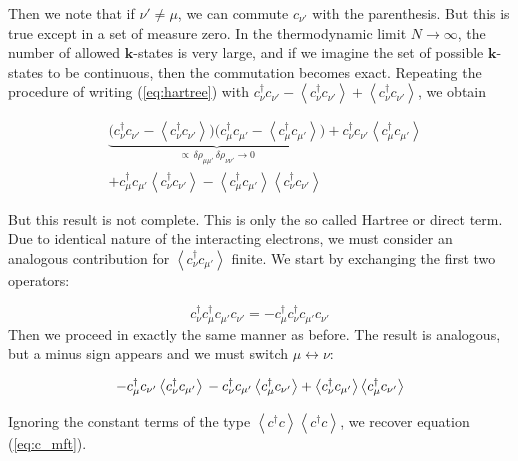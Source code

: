 \documentclass[10pt, twocolumn, twoside]{article}
\begin{document}
Then we note that if $\nu' \neq \mu$, we can commute $c_{\nu'}$ with the parenthesis. But this is true except in a set of measure zero. In the thermodynamic limit $N \rightarrow \infty$, the number of allowed $\bm k$-states is very large, and if we imagine the set of possible $\bm k$-states to be continuous, then the commutation becomes exact. Repeating the procedure of writing (\ref{eq:hartree}) with $c_\nu^\dagger c_{\nu'} - \left\langle c_\nu^\dagger c_{\nu'} \right\rangle + \left\langle c_\nu^\dagger c_{\nu'} \right\rangle $, we obtain

\begin{equation}
\begin{split}
&\underbrace{\big( c_\nu^\dagger c_{\nu'} - \left\langle c_\nu^\dagger c_{\nu'} \right\rangle \big) \big( c_\mu^\dagger c_{\mu'} - \left\langle c_\mu^\dagger c_{\mu'} \right\rangle \big)}_{\propto \, \delta \rho_{\mu\mu'} \, \delta \rho_{\nu\nu'} \rightarrow 0} + c_\nu^\dagger c_{\nu'} \left\langle c_\mu^\dagger c_{\mu'} \right\rangle \\
&+ c_\mu^\dagger c_{\mu'} \left\langle c_\nu^\dagger c_{\nu'} \right\rangle - \left\langle c_\mu^\dagger c_{\mu'} \right\rangle \left\langle c_\nu^\dagger c_{\nu'} \right\rangle
\end{split}
\end{equation}

But this result is not complete. This is only the so called Hartree or direct term. Due to identical nature of the interacting electrons, we must consider an analogous contribution for $\left\langle c_\nu^\dagger c_{\mu'} \right\rangle$ finite. We start by exchanging the first two operators: 

\begin{equation}
c_\nu^\dagger c_\mu^\dagger c_{\mu'} c_{\nu'} = - c_\mu^\dagger c_\nu^\dagger c_{\mu'} c_{\nu'}
\end{equation}
Then we proceed in exactly the same manner as before. The result is analogous, but a minus sign appears and we must switch $\mu \leftrightarrow \nu$:

\begin{equation}
- c_\mu^\dagger c_{\nu'} \left\langle c_\nu^\dagger c_{\mu'} \right\rangle \\
- c_\nu^\dagger c_{\mu'} \left\langle c_\mu^\dagger c_{\nu'} \right\rangle + \left\langle c_\nu^\dagger c_{\mu'} \right\rangle \left\langle c_\mu^\dagger c_{\nu'} \right\rangle
\end{equation}

Ignoring the constant terms of the type $\left\langle c^\dagger c \right\rangle \left\langle c^\dagger c \right\rangle$, we recover equation (\ref{eq:c_mft}).
\end{document}
